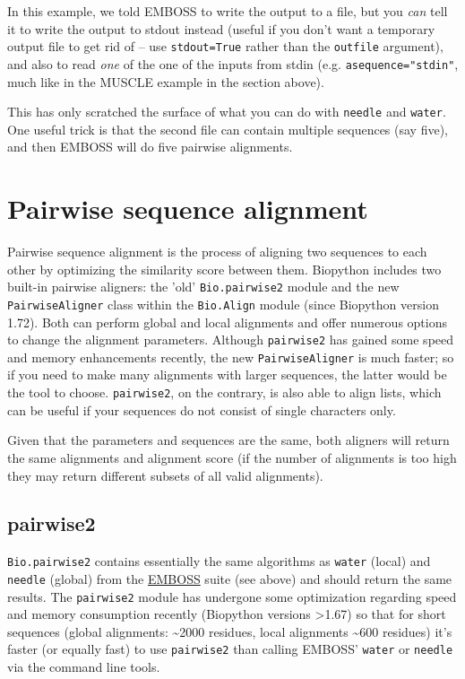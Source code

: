 In this example, we told EMBOSS to write the output to a file, but you
\emph{can} tell it to write the output to stdout instead (useful if you
don't want a temporary output file to get rid of -- use
\texttt{stdout=True} rather than the \texttt{outfile} argument), and
also to read \emph{one} of the one of the inputs from stdin (e.g.
\texttt{asequence="stdin"}, much like in the MUSCLE example in the
section above).

This has only scratched the surface of what you can do with \texttt{needle}
and \texttt{water}. One useful trick is that the second file can contain
multiple sequences (say five), and then EMBOSS will do five pairwise
alignments.


\section{Pairwise sequence alignment}
\label{sec:pairwise}

Pairwise sequence alignment is the process of aligning two sequences to each
other by optimizing the similarity score between them. Biopython includes two
built-in pairwise aligners: the 'old' \verb|Bio.pairwise2| module and the new
\verb|PairwiseAligner| class within the \verb|Bio.Align| module (since Biopython
version 1.72). Both can perform global and local alignments and offer numerous
options to change the alignment parameters. Although \verb|pairwise2| has gained
some speed and memory enhancements recently, the new \verb|PairwiseAligner| is
much faster; so if you need to make many alignments with larger sequences, the
latter would be the tool to choose. \verb|pairwise2|, on the contrary, is also
able to align lists, which can be useful if your sequences do not consist of
single characters only. 

Given that the parameters and sequences are the same, both aligners will return
the same alignments and alignment score (if the number of alignments is too high
they may return different subsets of all valid alignments).

\subsection{pairwise2}
\label{sec:pairwise2}

\verb|Bio.pairwise2| contains essentially the same algorithms as
\texttt{water} (local) and \texttt{needle} (global) from the
\href{http://emboss.sourceforge.net/}{EMBOSS} suite (see above) and should
return the same results. The \verb|pairwise2| module has undergone some
optimization regarding speed and memory consumption recently (Biopython versions
\textgreater 1.67) so that for short sequences (global alignments:
\textasciitilde 2000 residues, local alignments \textasciitilde 600 residues)
it's faster (or equally fast) to use \verb|pairwise2| than calling EMBOSS' 
\texttt{water} or \texttt{needle} via the command line tools.

